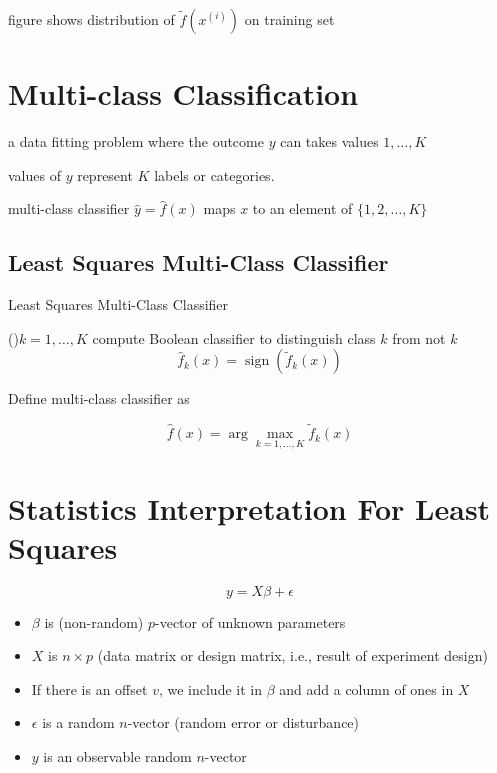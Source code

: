 figure shows distribution of $ \tilde{f}\left(x^{(i)}\right) $ on training set

\section{Multi-class Classification}

\begin{problem}
    a data fitting problem where the outcome $ y $ can takes values $ 1, \ldots, K $

    values of $ y $ represent $ K $ labels or categories.

    multi-class classifier $ \hat{y}=\hat{f}(x) $ maps $ x $ to an element of $ \{1,2, \ldots, K\} $
\end{problem}

\subsection{Least Squares Multi-Class Classifier}

\begin{algorithm}[htbp]
    \caption{Least Squares Multi-Class Classifier}
    \For(){$ k=1, \ldots, K $}{
        compute Boolean classifier to distinguish class $ k $ from not $ k $
\begin{equation}
\hat{f}_{k}(x)=\operatorname{sign}\left(\tilde{f}_{k}(x)\right)
\end{equation}
    }
\end{algorithm}

Define multi-class classifier as

\begin{definition}
    \begin{equation}
\hat{f}(x)=\arg \underset{k=1, \ldots, K}{\max} \tilde{f}_{k}(x)
\end{equation}
\end{definition}



\section{Statistics Interpretation For Least Squares}

\begin{problem}
    \begin{equation}
y=X \beta+\epsilon
\end{equation}

\begin{itemize}
    \item $ \beta $ is (non-random) $ p $-vector of unknown parameters
    \item $ X $ is $ n \times p $ (data matrix or design matrix, i.e., result of experiment design)
    \item If there is an offset $ v $, we include it in $ \beta $ and add a column of ones in $ X $
    \item $ \epsilon $ is a random $ n $-vector (random error or disturbance)
    \item $ y $ is an observable random $ n $-vector
\end{itemize}
\end{problem}

